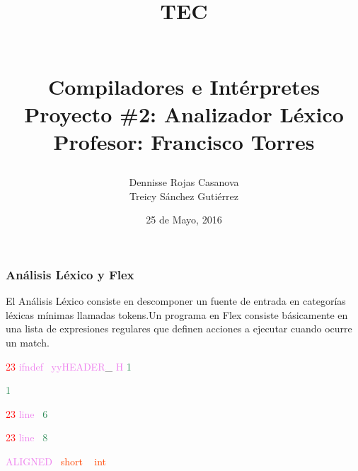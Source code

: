 \documentclass[8, usernames, dvipsnames]{beamer}
\begin{document}
 
\title{
\begin{Large}
TEC
\end{Large}
\newline
\begin{Large}
\\Compiladores e Int\'erpretes
\\Proyecto \#2: Analizador L\'exico
\\Profesor: Francisco Torres
\end{Large}
}
\author{Dennisse Rojas Casanova
\\Treicy S\'anchez Guti\'errez}
\date{25 de Mayo, 2016}
\maketitle 
\begin{frame} 
\frametitle{An\'alisis L\'exico y Flex} 
El An\'alisis L\'exico consiste en descomponer un fuente de entrada en categor\'ias l\'exicas m\'inimas llamadas tokens.Un programa en Flex consiste b\'asicamente en una lista de expresiones regulares que definen acciones a ejecutar cuando ocurre un match.\end{frame} 
\begin{frame}
 \textcolor{Red}{23}
\textcolor{Violet}{ifndef}\textcolor{White}{\ }
\textcolor{Violet}{yyHEADER}\textcolor{Sepia}{\_}
\textcolor{Violet}{H}
 \textcolor{SeaGreen}{1}

 \textcolor{SeaGreen}{1}

 
  \textcolor{Red}{23}
\textcolor{Violet}{line}\textcolor{White}{\ }
\textcolor{SeaGreen}{6}
\textcolor{White}{\ }

 
  \textcolor{Red}{23}
\textcolor{Violet}{line}\textcolor{White}{\ }
\textcolor{SeaGreen}{8}
\textcolor{White}{\ }

 
 \textcolor{Violet}{ALIGNED}\textcolor{White}{\ }
\textcolor{OrangeRed}{short}
\textcolor{White}{\ }
\textcolor{OrangeRed}{int}

 
 \end{frame}
\end{document}
